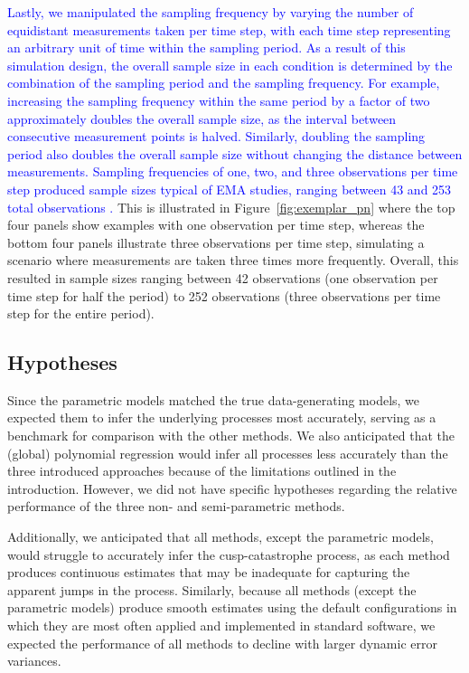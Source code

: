 \documentclass[man, floatsintext]{apa7}
\begin{document}
\textcolor{blue}{
  Lastly, we manipulated the sampling frequency by varying the number of
  equidistant measurements taken per time step, with each time step
  representing
  an arbitrary unit of time within the sampling period. As a result of this
  simulation design, the overall sample size in each condition is determined by
  the combination of the sampling period and the sampling frequency. For
  example,
  increasing the sampling frequency within the same period by a factor of two
  approximately doubles the overall sample size, as the interval between
  consecutive measurement points is halved. Similarly, doubling the sampling
  period also doubles the overall sample size without changing the distance
  between measurements. Sampling frequencies of one, two, and three
  observations
  per time step produced sample sizes typical of EMA studies, ranging between
  43
  and 253 total observations \parencite{wrzus_ecological_2023}.
} This is illustrated in
Figure~\ref{fig:exemplar_pn} where the top four panels show examples with one
observation per time step, whereas the bottom four panels illustrate three
observations per time step, simulating a scenario where measurements are taken
three times more frequently. Overall, this resulted in sample sizes ranging
between 42 observations (one observation per time step for half the period) to
252 observations (three observations per time step for the entire period).

\subsection{Hypotheses}

Since the parametric models matched the true data-generating models, we
expected them to infer the underlying processes most accurately, serving as a
benchmark for comparison with the other methods. We also anticipated that the
(global) polynomial regression would infer all processes less accurately than
the three introduced approaches because of the limitations outlined in the
introduction. However, we did not have specific hypotheses regarding the
relative performance of the three non- and semi-parametric methods.

Additionally, we anticipated that all methods, except the parametric models,
would struggle to accurately infer the cusp-catastrophe process, as each method
produces continuous estimates that may be inadequate for capturing the apparent
jumps in the process. Similarly, because all methods (except the parametric
models) produce smooth estimates using the default configurations in which they
are most often applied and implemented in standard software, we expected the
performance of all methods to decline with larger dynamic error variances.
\end{document}
